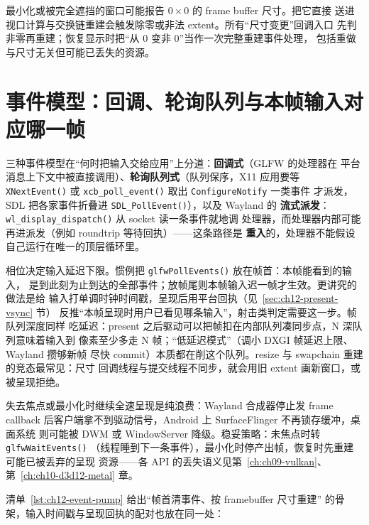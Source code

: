 \documentclass[12pt,a4paper,fontset=fandol]{ctexbook}
\newcommand{\Fn}[1]{\texttt{#1()}}
\newcommand{\Tp}[1]{\texttt{#1}}
\newcommand{\Bk}{\discretionary{}{}{}}
\begin{document}
\begin{warning}[title={最小化时 frame buffer 尺寸可能为零}]
最小化或被完全遮挡的窗口可能报告 $0\times0$ 的 frame buffer 尺寸。把它直接
送进视口计算与交换链重建会触发除零或非法 extent。所有``尺寸变更''回调入口
先判非零再重建；恢复显示时把``从 0 变非 0''当作一次完整重建事件处理，
包括重做与尺寸无关但可能已丢失的资源。
\end{warning}

\section{事件模型：回调、轮询队列与本帧输入对应哪一帧}
\label{sec:ch12-event-phase}

三种事件模型在``何时把输入交给应用''上分道：\textbf{回调式}（GLFW 的处理器在
平台消息上下文中被直接调用）、\textbf{轮询队列式}（队列保序，X11 应用要等
\Fn{XNextEvent} 或 \Fn{xcb\_poll\_event} 取出 \Tp{ConfigureNotify} 一类事件
才派发，SDL 把各家事件折叠进 \Fn{SDL\_PollEvent}），以及 Wayland 的
\textbf{流式派发}：\Fn{wl\_display\Bk\_dispatch} 从 socket 读一条事件就地调
处理器，而处理器内部可能再进派发（例如 roundtrip 等待回执）——这条路径是
\textbf{重入}的，处理器不能假设自己运行在唯一的顶层循环里。

相位决定输入延迟下限。惯例把 \Fn{glfwPollEvents} 放在帧首：本帧能看到的输入，
是到此刻为止到达的全部事件；放帧尾则本帧输入迟一帧才生效。更讲究的做法是给
输入打单调时钟时间戳，呈现后用平台回执（见~\ref{sec:ch12-present-vsync} 节）
反推``本帧呈现时用户已看见哪条输入''，射击类判定需要这一步。帧队列深度同样
吃延迟：present 之后驱动可以把帧扣在内部队列凑同步点，N 深队列意味着输入到
像素至少多走 N 帧；``低延迟模式''（调小 DXGI 帧延迟上限、Wayland 攒够新帧
尽快 commit）本质都在削这个队列。resize 与 swapchain 重建的竞态最常见：尺寸
回调线程与提交线程不同步，就会用旧 extent 画新窗口，或被呈现拒绝。

\begin{note}[title={焦点、最小化与呈现暂停}]
失去焦点或最小化时继续全速呈现是纯浪费：Wayland 合成器停止发 frame callback
后客户端拿不到驱动信号，Android 上 SurfaceFlinger 不再锁存缓冲，桌面系统
则可能被 DWM 或 WindowServer 降级。稳妥策略：未焦点时转 \Fn{glfwWaitEvents}
（线程睡到下一条事件），最小化时停产出帧，恢复时先重建可能已被丢弃的呈现
资源——各 API 的丢失语义见第~\ref{ch:ch09-vulkan}、第~\ref{ch:ch10-d3d12-metal} 章。
\end{note}

清单~\ref{lst:ch12-event-pump} 给出``帧首清事件、按 framebuffer 尺寸重建''
的骨架，输入时间戳与呈现回执的配对也放在同一处：
\end{document}
